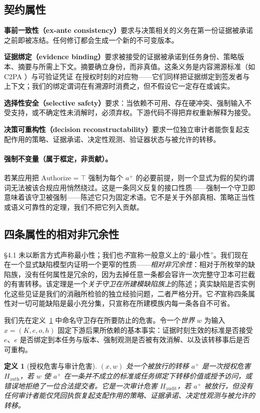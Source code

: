 \documentclass[11pt]{ctexart}
\newtheorem{definition}{定义}
\begin{document}
\subsection{契约属性}
\textbf{事前一致性（ex-ante consistency）}要求与决策相关的义务在第一份证据被承诺之前即被冻结。任何修订都会生成一个新的不可变版本。

\textbf{证据绑定（evidence binding）}要求被接受的证据被承诺到任务身份、策略版本、摘要与所需上下文。摘要确立身份，而非真值。这条义务是内容溯源标准（如 C2PA \cite{c2pa2023spec}）与可验证凭证 \cite{sporny2022vc} 在授权时刻的对应物——它们同样把证据绑定到签发者与上下文；我们的绑定谓词在有溯源时消费之，但不假设它一定存在或诚实。

\textbf{选择性安全（selective safety）}要求：当依赖不可用、存在硬冲突、强制输入不受支持，或不确定性未消解时，必须弃权。下游代码不得把弃权重新解释为接受。

\textbf{决策可重构性（decision reconstructability）}要求一位独立审计者能恢复起支配作用的策略、证据承诺、决定性观测、验证器状态与被允许的转移。

\paragraph{强制不变量（属于框定，非贡献）。} 若某应用把 $\mathrm{Authorize}=\top$ 强制为每个 $a^+$ 的必要前提，则一个显式为假的契约谓词无法被该合规应用悄然绕过。这是一条同义反复的接口性质——强制一个守卫即意味着该守卫被强制——陈述它只为固定术语。它不是关于外部真相、策略正当性或语义可靠性的定理，我们不把它列入贡献。

\subsection{四条属性的相对非冗余性}
\S4.1 未以断言方式声称最小性；我们也\emph{不}宣称一般意义上的“最小性”。我们现在在一个显式缺陷模型内证明一个更窄的性质——\emph{相对非冗余性}：相对于所枚举的缺陷族，没有任何属性是冗余的，因为去掉任意一条都会容许一次完整守卫本可拦截的有害转移。该定理是一个\emph{关于守卫在所建模缺陷族上}的陈述；真实缺陷是否实例化这些见证是我们的消融所检验的独立经验问题，二者严格分开。它\emph{不}宣称四条属性对一切可能缺陷是最小充分集，只宣称在所建模族内每一条各自不可省。

我们先在定义~\ref{def:harm} 中命名守卫存在所要防止的危害。令一个\emph{世界} $w$ 为输入 $x=(K,e,o,h)$ 固定下游后果所依赖的基本事实：证据时刻生效的标准是否接受 $e$、$e$ 是否绑定到本任务与版本、强制观测是否被有效消解、以及该转移事后是否可重构。

\begin{definition}[授权危害与审计危害]
\label{def:harm}
$(x,w)$ 处一个被放行的转移 $a^+$ 是一次\emph{授权危害} $H_{\mathrm{auth}}$，若 $w$ 使 $a^+$ 在一条并不成立的标准或任务绑定下转移价值或授予访问，或错误地拒绝了一位合法提交者。它是一次\emph{审计危害} $H_{\mathrm{audit}}$，若 $a^+$ 被放行，但没有任何审计者能仅凭回执恢复起支配作用的策略、证据承诺、决定性观测与被允许的转移。
\end{definition}
\end{document}
